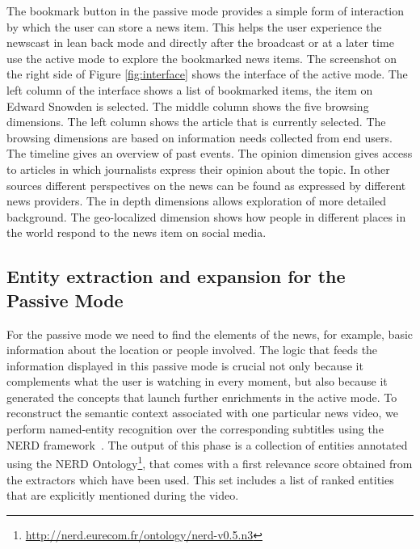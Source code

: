 \documentclass{llncs}
\begin{document}
The bookmark button in the passive mode provides a simple form of interaction by which the user can store a news item. This helps the user experience the newscast in lean back mode and directly after the broadcast or at a later time use the active mode to explore the bookmarked news items. The screenshot on the right side of Figure \ref{fig:interface} shows the interface of the active mode. The left column of the interface shows a list of bookmarked items, the item on Edward Snowden is selected. The middle column shows the five browsing dimensions. The left column shows the article that is currently selected. The browsing dimensions are based on information needs collected from end users. The timeline gives an overview of past events. The opinion dimension gives access to articles in which journalists express their opinion about the topic. In other sources different perspectives on the news can be found as expressed by different news providers. The in depth dimensions allows exploration of more detailed background. The geo-localized dimension shows how people in different places in the world respond to the news item on social media.


\subsection{Entity extraction and expansion for the Passive Mode}
\label{sec:leanbackmode}

For  the passive mode we need to find the elements of the news, for example, basic information about the location or people involved. The logic that feeds the information displayed in this passive mode is crucial not only because it complements what the user is watching in every moment, but also because it generated the concepts that launch further enrichments in the active mode. To reconstruct the semantic context associated with one particular news video, we perform named-entity recognition over the corresponding subtitles using the NERD framework~\cite{Rizzo2012b}. The output of this phase is a collection of entities annotated using the NERD Ontology\footnote{\fontsize{8pt}{1em}\selectfont \url{http://nerd.eurecom.fr/ontology/nerd-v0.5.n3}}, that comes with a first relevance score obtained from the extractors which have been used. This set includes a list of ranked entities that are explicitly mentioned during the video.
\end{document}
